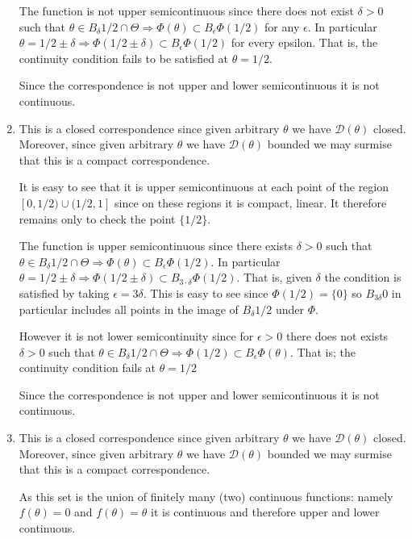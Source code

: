 \documentclass[12pt]{article}
\begin{document}
\begin{enumerate}
The function is not upper semicontinuous since  there does not exist $\delta > 0$ such that $\theta \in B_\delta 1/2 \cap \Theta \Rightarrow \Phi(\theta) \subset B_\epsilon \Phi(1/2)$ for any $ \epsilon$. In particular $\theta = 1/2 \pm \delta \Rightarrow \Phi(1/2 \pm \delta) \subset B_{\epsilon } \Phi(1/2)$ for every epsilon. That is, the continuity condition fails to be satisfied at $\theta = 1/2$.

Since the correspondence is not upper and lower semicontinuous it is not continuous.


\item This is a closed correspondence since given arbitrary $\theta$ we have $\mathcal{D}(\theta) $ closed. Moreover, since given arbitrary $\theta$ we have $\mathcal{D}(\theta) $ bounded we may surmise that this is a compact correspondence. 

It is easy to see that it is upper semicontinuous at each point of the region $[0,1/2) \cup (1/2,1]$ since on these regions it is compact, linear. It therefore remains only to check the point $\{1/2\}$.

The function is upper semicontinuous since  there exists $\delta > 0$ such that $\theta \in B_\delta 1/2 \cap \Theta \Rightarrow \Phi(\theta) \subset B_\epsilon \Phi(1/2)$. In particular $\theta = 1/2 \pm \delta \Rightarrow \Phi(1/2 \pm \delta) \subset B_{3 \cdot \delta} \Phi(1/2)$. That is, given $\delta$ the condition is satisfied by taking $\epsilon = 3 \delta$. This is easy to see since $\Phi(1/2)=\{0\}$ so $B_{3 \delta} 0$ in particular includes all points in the image of $B_\delta 1/2$ under $\Phi$.

However it is not lower semicontinuity since for $\epsilon >0$ there does not exists $\delta >0$ such that $\theta \in B_\delta 1/2 \cap \Theta \Rightarrow \Phi(1/2) \subset B_\epsilon \Phi(\theta)$. That is; the continuity condition fails at $\theta = 1/2$ 

Since the correspondence is not upper and lower semicontinuous it is not continuous.

\item This is a closed correspondence since given arbitrary $\theta$ we have $\mathcal{D}(\theta) $ closed. Moreover, since given arbitrary $\theta$ we have $\mathcal{D}(\theta) $ bounded we may surmise that this is a compact correspondence. 

As this set is the union of finitely many (two) continuous functions: namely $f(\theta) = 0$ and $f(\theta) = \theta$ it is continuous and therefore upper and lower continuous. 

\end{enumerate}
\end{document}
